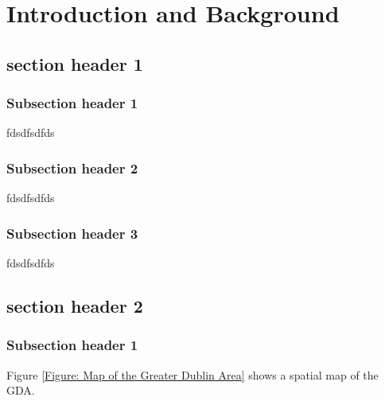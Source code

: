 

\chapter{Introduction and Background} \label{sec:introduction}

\section{section header 1}

\subsection{Subsection header 1}
fdsdfsdfds
\subsection{Subsection header 2}
fdsdfsdfds
\subsection{Subsection header 3}
fdsdfsdfds


\section{section header 2}

\subsection{Subsection header 1}

Figure \ref{Figure: Map of the Greater Dublin Area} shows a spatial map of the GDA.

